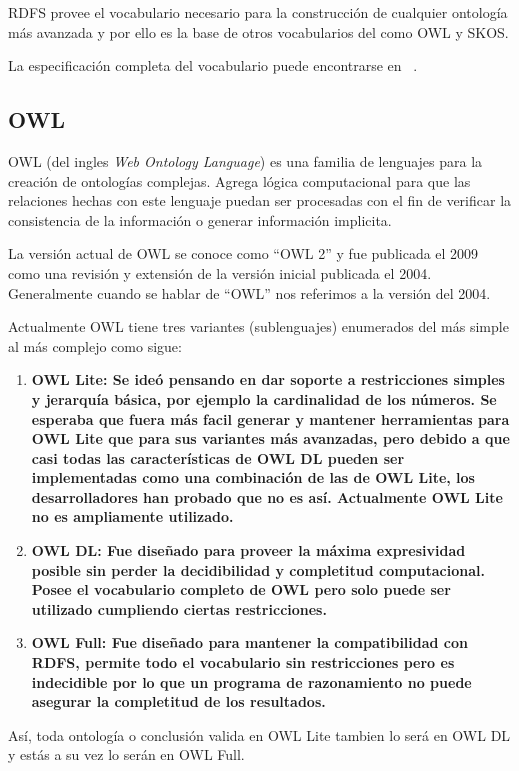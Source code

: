 RDFS provee el vocabulario necesario para la construcción de cualquier ontología
más avanzada y por ello es la base de otros vocabularios del como OWL y SKOS.

La especificación completa del vocabulario puede encontrarse en ~\cite{brickley2014rdfs}.

\subsection{OWL}
OWL (del ingles \emph{Web Ontology Language}) es una familia de lenguajes para
la creación de ontologías complejas.
Agrega lógica computacional para que las relaciones
hechas con este lenguaje puedan ser procesadas con el fin de verificar la
consistencia de la información o generar información implicita.

La versión actual de OWL se conoce como ``OWL 2'' y fue publicada el 2009 como 
una revisión y extensión de la versión inicial publicada el
2004\cite{bikakis2013semantic}. Generalmente cuando se hablar de ``OWL'' nos
referimos a la versión del 2004.

Actualmente OWL tiene tres variantes (sublenguajes) enumerados del más simple al
más complejo como sigue\cite{mcguiness2004owl}:
\begin{enumerate}
  \item \bf{OWL Lite}:
    Se ideó pensando en dar soporte a restricciones simples y jerarquía básica,
    por ejemplo la cardinalidad de los números. 
    Se esperaba que fuera más facil generar y mantener herramientas para OWL
    Lite que para sus variantes más avanzadas, pero debido a que casi todas las
    características de OWL DL pueden ser implementadas como una combinación de
    las de OWL Lite, los desarrolladores han probado que no es 
    así\cite{grau2008owl}. Actualmente OWL Lite no es ampliamente utilizado.
  \item \bf{OWL DL}:
    Fue diseñado para proveer la máxima expresividad posible sin perder la
    decidibilidad y completitud computacional. Posee el vocabulario completo de
    OWL pero solo puede ser utilizado cumpliendo ciertas restricciones.
  \item \bf{OWL Full}:
    Fue diseñado para mantener la compatibilidad con RDFS, permite todo el
    vocabulario sin restricciones pero es indecidible por lo que un programa de
    razonamiento no puede asegurar la completitud de los resultados.
\end{enumerate}
Así, toda ontología o conclusión valida en OWL Lite tambien lo será en OWL DL y
estás a su vez lo serán en OWL Full.

